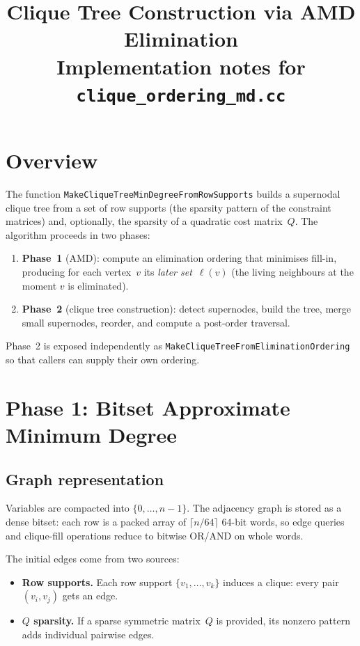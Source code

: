 \documentclass[11pt]{article}
\title{Clique Tree Construction via AMD Elimination\\
  {\large Implementation notes for \texttt{clique\_ordering\_md.cc}}}
\date{}
\begin{document}
\maketitle

\section{Overview}

The function \texttt{MakeCliqueTreeMinDegreeFromRowSupports} builds a
supernodal clique tree from a set of row supports (the sparsity pattern of
the constraint matrices) and, optionally, the sparsity of a quadratic cost
matrix~$Q$.  The algorithm proceeds in two phases:
\begin{enumerate}
  \item \textbf{Phase~1} (AMD): compute an elimination ordering that
    minimises fill-in, producing for each vertex~$v$ its \emph{later
    set}~$\ell(v)$ (the living neighbours at the moment $v$ is eliminated).
  \item \textbf{Phase~2} (clique tree construction): detect supernodes,
    build the tree, merge small supernodes, reorder, and compute a
    post-order traversal.
\end{enumerate}

Phase~2 is exposed independently as
\texttt{MakeCliqueTreeFromEliminationOrdering} so that callers can supply
their own ordering.

\section{Phase 1: Bitset Approximate Minimum Degree}

\subsection{Graph representation}

Variables are compacted into $\{0,\ldots,n{-}1\}$.  The adjacency graph is
stored as a dense bitset: each row is a packed array of $\lceil n/64\rceil$
64-bit words, so edge queries and clique-fill operations reduce to bitwise
OR/AND on whole words.

The initial edges come from two sources:
\begin{itemize}
  \item \textbf{Row supports.}  Each row support $\{v_1,\ldots,v_k\}$
    induces a clique: every pair $(v_i,v_j)$ gets an edge.
  \item \textbf{$Q$ sparsity.}  If a sparse symmetric matrix~$Q$ is
    provided, its nonzero pattern adds individual pairwise edges.
\end{itemize}
\end{document}
